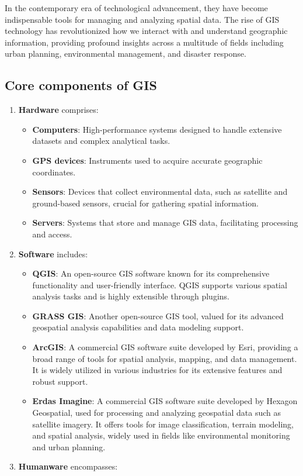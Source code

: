 \documentclass[
  12 pt,
]{Nemilov}
\providecommand{\tightlist}{%
  \setlength{\itemsep}{0pt}\setlength{\parskip}{0pt}}
\begin{document}
In the contemporary era of technological advancement, they have become indispensable tools for managing and analyzing spatial data. The rise of GIS technology has revolutionized how we interact with and understand geographic information, providing profound insights across a multitude of fields including urban planning, environmental management, and disaster response.

\subsection{Core components of GIS}\label{core-components-of-gis}

\begin{enumerate}
\def\labelenumi{\arabic{enumi}.}
\tightlist
\item
  \textbf{Hardware} comprises:

  \begin{itemize}
  \tightlist
  \item
    \textbf{Computers}: High-performance systems designed to handle extensive datasets and complex analytical tasks.
  \item
    \textbf{GPS devices}: Instruments used to acquire accurate geographic coordinates.
  \item
    \textbf{Sensors}: Devices that collect environmental data, such as satellite and ground-based sensors, crucial for gathering spatial information.
  \item
    \textbf{Servers}: Systems that store and manage GIS data, facilitating processing and access.
  \end{itemize}
\item
  \textbf{Software} includes:

  \begin{itemize}
  \tightlist
  \item
    \textbf{QGIS}: An open-source GIS software known for its comprehensive functionality and user-friendly interface. QGIS supports various spatial analysis tasks and is highly extensible through plugins.
  \item
    \textbf{GRASS GIS}: Another open-source GIS tool, valued for its advanced geospatial analysis capabilities and data modeling support.
  \item
    \textbf{ArcGIS}: A commercial GIS software suite developed by Esri, providing a broad range of tools for spatial analysis, mapping, and data management. It is widely utilized in various industries for its extensive features and robust support.
  \item
    \textbf{Erdas Imagine}: A commercial GIS software suite developed by Hexagon Geospatial, used for processing and analyzing geospatial data such as satellite imagery. It offers tools for image classification, terrain modeling, and spatial analysis, widely used in fields like environmental monitoring and urban planning.
  \end{itemize}
\item
  \textbf{Humanware} encompasses:


\end{enumerate}
\end{document}
